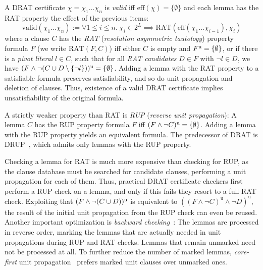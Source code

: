 \documentclass[smallcondensed]{svjour3}     %
\begin{document}
A DRAT certificate $\chi = \chi_1\ldots\chi_n$ is \emph{valid} iff $\textrm{eff}(\chi) = \{\emptyset\}$ and each lemma has the RAT property \wrt the effect of the previous items:
\[
  \textrm{valid}(\chi_1 \ldots \chi_n) := \forall 1\le i\le n.~\chi_i\in2^L \implies\textrm{RAT}( \textrm{eff}(\chi_1\ldots \chi_{i-1}), \chi_i )
\]
where a clause $C$ has the \emph{RAT} (\emph{resolution asymmetric tautology}) property \wrt formula $F$ (we write $\textrm{RAT}(F,C)$) iff either $C$ is empty and $F^{\textrm u}=\{\emptyset\}$,
or if there is a \emph{pivot literal} $l\in C$, such that for all \emph{RAT candidates} $D\in F$ with $\neg l \in D$, we have $(F \wedge \neg(C \cup D\setminus\{\neg l\}))^{\textrm u} = \{\emptyset\}$.
Adding a lemma with the RAT property to a satisfiable formula preserves satisfiability, and so do unit propagation and deletion of clauses. Thus, existence of a valid DRAT certificate implies unsatisfiability of the original formula.


A strictly weaker property than RAT is \emph{RUP} (\emph{reverse unit propagation}): A lemma $C$ has the RUP property \wrt formula $F$ iff $(F \wedge \neg C)^{\textrm u} = \{\emptyset\}$.
Adding a lemma with the RUP property yields an equivalent formula. The predecessor of DRAT is DRUP~\cite{HHW13}, which admits only lemmas with the RUP property.

Checking a lemma for RAT is much more expensive than checking for RUP, as the clause database must be searched for candidate clauses,
performing a unit propagation for each of them. Thus, practical DRAT certificate checkers first perform a RUP check on a lemma, and only if 
this fails they resort to a full RAT check. Exploiting that $(F\wedge\neg(C\cup D))^\textrm{u}$ is equivalent to $((F \wedge \neg C)^\textrm{u} \wedge \neg D)^\textrm{u}$,
the result of the initial unit propagation from the RUP check can even be reused.
Another important optimization is \emph{backward checking}~\cite{GoNo03,HHW13}: The lemmas are processed in reverse order, marking the lemmas that are actually needed 
in unit propagations during RUP and RAT checks. Lemmas that remain unmarked need not be processed at all. To further reduce the number of marked lemmas, 
\emph{core-first} unit propagation~\cite{WHH14} prefers marked unit clauses over unmarked ones.
\end{document}
